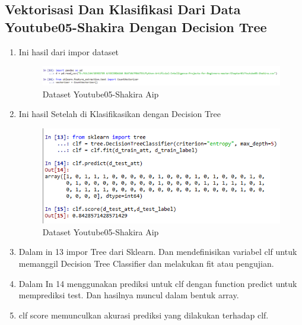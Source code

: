\subsection{ Vektorisasi Dan Klasifikasi Dari Data Youtube05-Shakira Dengan Decision Tree}
\begin{enumerate}
\item Ini hasil dari impor dataset
\begin{figure}[ht]
\centering
\includegraphics[scale=0.5]{figures/AIP/c7.PNG}
\caption{Dataset Youtube05-Shakira Aip}
\label{Praktek}
\end{figure}
\item Ini hasil Setelah di Klasifikasikan dengan Decision Tree
\begin{figure}[ht]
\centering
\includegraphics[scale=0.5]{figures/AIP/c6.PNG}
\caption{Dataset Youtube05-Shakira Aip}
\label{Praktek}
\end{figure}
\item Dalam in 13 impor Tree dari Sklearn. Dan mendefinisikan variabel clf untuk memanggil Decision Tree Classifier dan melakukan fit atau pengujian.
\item Dalam In 14 menggunakan prediksi untuk clf dengan function predict  untuk memprediksi test. Dan hasilnya muncul dalam bentuk array.
\item clf score memunculkan akurasi prediksi yang dilakukan terhadap clf.
\end{enumerate}

